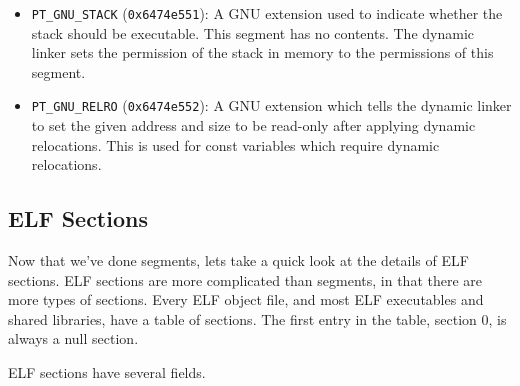 \begin{itemize}
    \item \texttt{PT\_GNU\_STACK} (\texttt{0x6474e551}): A GNU extension used to
          indicate whether the stack should be executable.  This segment has no
          contents.  The dynamic linker sets the permission of the stack in
          memory to the permissions of this segment.

    \item \texttt{PT\_GNU\_RELRO} (\texttt{0x6474e552}): A GNU extension which tells
          the dynamic linker to set the given address and size to be read-only
          after applying dynamic relocations.  This is used for const variables
          which require dynamic relocations.

\end{itemize}

\subsection{ELF Sections}

Now that we've done segments, lets take a quick look at the details of ELF
sections.  ELF sections are more complicated than segments, in that there are
more types of sections.  Every ELF object file, and most ELF executables and
shared libraries, have a table of sections.  The first entry in the table,
section 0, is always a null section.

ELF sections have several fields.

